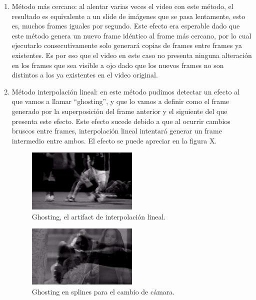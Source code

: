 \begin{enumerate}
\item M\'etodo m\'as cercano: al alentar varias veces el video con este m\'etodo, el resultado es equivalente a un slide de im\'agenes que se pasa lentamente, esto es, muchos frames iguales por segundo. Este efecto era esperable dado que este m\'etodo genera un nuevo frame id\'entico al frame m\'as cercano, por lo cual ejecutarlo consecutivamente solo generar\'a copias de frames entre frames ya existentes. Es por eso que el video en este caso no presenta ninguna alteraci\'on en los frames que sea visible a ojo dado que los nuevos frames no son distintos a los ya existentes en el video original.
\item M\'etodo interpolaci\'on lineal: en este m\'etodo pudimos detectar un efecto al que vamos a llamar ``ghosting'', y que lo vamos a definir como el frame generado por la superposici\'on del frame anterior y el siguiente del que presenta este efecto. Este efecto sucede debido a que al ocurrir cambios bruscos entre frames, interpolaci\'on lineal intentar\'a generar un frame intermedio entre ambos. El efecto se puede apreciar en la figura X.

\begin{figure}[h!]
  \centering
    \includegraphics[width=0.5\textwidth]{img/artifact_lineal.png}
  	\caption{Ghosting, el artifact de interpolaci\'on lineal.}
\end{figure}

\begin{figure}[h!]
  \centering
    \includegraphics[width=0.5\textwidth]{img/ghosting_splines_1.png}
  	\caption{Ghosting en splines para el cambio de c\'amara.}
\end{figure}


\end{enumerate}
